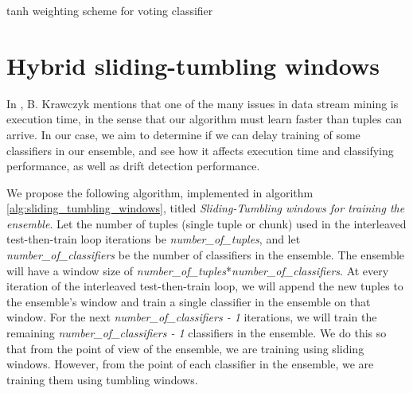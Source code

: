 \begin{algorithm}
    \caption{\label{alg:new_voting_scheme}tanh weighting scheme for voting classifier}
\end{algorithm}




\section{Hybrid sliding-tumbling windows\label{section:hybrid-windows}}
In \cite{KRAWCZYK2017132}, B. Krawczyk mentions that one of the many issues in data stream mining is execution time, in the sense that our algorithm must learn faster than tuples can arrive. In our case, we aim to determine if we can delay training of some classifiers in our ensemble, and see how it affects execution time and classifying performance, as well as drift detection performance.

We propose the following algorithm, implemented in algorithm \ref{alg:sliding_tumbling_windows}, titled \textit{Sliding-Tumbling windows for training the ensemble}.
Let the number of tuples (single tuple or chunk) used in the interleaved test-then-train loop iterations be \textit{number\_of\_tuples}, and let \textit{number\_of\_classifiers} be the number of classifiers in the ensemble. The ensemble will have a window size of \textit{number\_of\_tuples}*\textit{number\_of\_classifiers}. At every iteration of the interleaved test-then-train loop, we will append the new tuples to the ensemble's window and train a single classifier in the ensemble on that window. For the next \textit{number\_of\_classifiers - 1} iterations, we will train the remaining \textit{number\_of\_classifiers - 1} classifiers in the ensemble. We do this so that from the point of view of the ensemble, we are training using sliding windows. However, from the point of each classifier in the ensemble, we are training them using tumbling windows.

